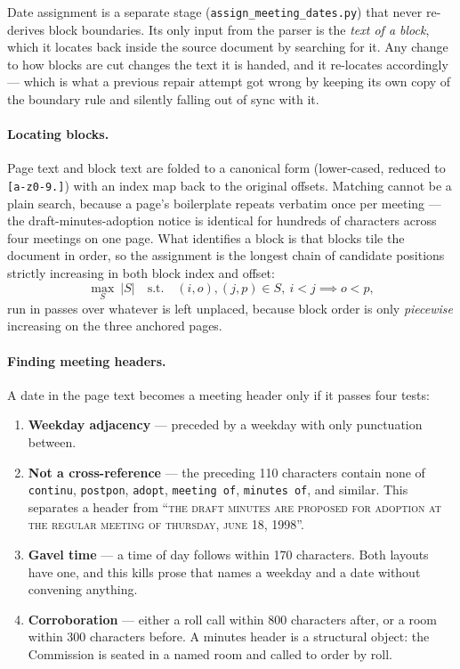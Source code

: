 \documentclass[11pt]{article}
\begin{document}
Date assignment is a separate stage (\texttt{assign\_meeting\_dates.py}) that never
re-derives block boundaries. Its only input from the parser is the \emph{text of a block},
which it locates back inside the source document by searching for it. Any change to how
blocks are cut changes the text it is handed, and it re-locates accordingly --- which is
what a previous repair attempt got wrong by keeping its own copy of the boundary rule and
silently falling out of sync with it.

\paragraph{Locating blocks.} Page text and block text are folded to a canonical form
(lower-cased, reduced to \texttt{[a-z0-9.]}) with an index map back to the original
offsets. Matching cannot be a plain search, because a page's boilerplate repeats verbatim
once per meeting --- the draft-minutes-adoption notice is identical for hundreds of
characters across four meetings on one page. What identifies a block is that blocks tile
the document in order, so the assignment is the longest chain of candidate positions
strictly increasing in both block index and offset:
\[
\max_{S}\ |S| \quad \text{s.t.}\quad (i,o),(j,p)\in S,\ i<j \implies o<p ,
\]
run in passes over whatever is left unplaced, because block order is only \emph{piecewise}
increasing on the three anchored pages.

\paragraph{Finding meeting headers.} A date in the page text becomes a meeting header only
if it passes four tests:

\begin{enumerate}
\item \textbf{Weekday adjacency} --- preceded by a weekday with only punctuation between.
\item \textbf{Not a cross-reference} --- the preceding 110 characters contain none of
\texttt{continu}, \texttt{postpon}, \texttt{adopt}, \texttt{meeting of}, \texttt{minutes
of}, and similar. This separates a header from ``\textsc{the draft minutes are proposed for
adoption at the regular meeting of thursday, june 18, 1998}''.
\item \textbf{Gavel time} --- a time of day follows within 170 characters. Both layouts
have one, and this kills prose that names a weekday and a date without convening anything.
\item \textbf{Corroboration} --- either a roll call within 800 characters after, or a room
within 300 characters before. A minutes header is a structural object: the Commission is
seated in a named room and called to order by roll.
\end{enumerate}
\end{document}
